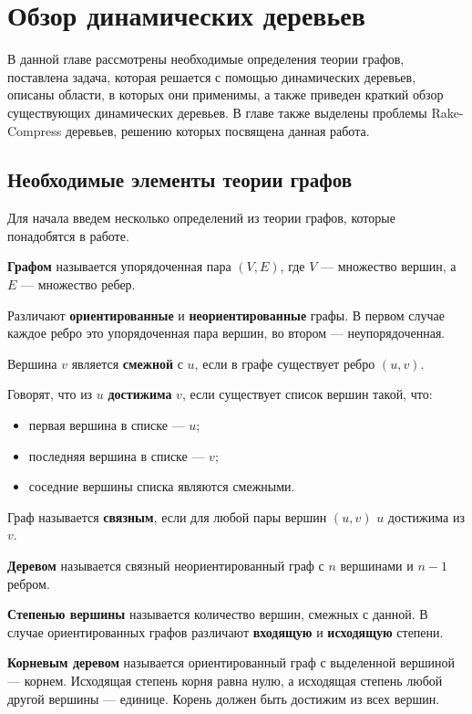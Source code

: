\chapter{Обзор динамических деревьев}
\label{chapSVD}

В данной главе рассмотрены необходимые определения теории графов, 
поставлена задача, которая решается с помощью динамических деревьев, 
описаны области, в которых они применимы, а также 
приведен краткий обзор существующих динамических деревьев. 
В главе также выделены проблемы Rake-Compress деревьев, решению которых посвящена данная работа.

\section{Необходимые элементы теории графов}

Для начала введем несколько определений из теории графов, которые понадобятся в работе.

{\bf Графом} называется упорядоченная пара $(V, E)$, где $V$ --- множество вершин, а $E$ --- множество ребер.

Различают {\bf ориентированные} и {\bf неориентированные} графы. В первом случае каждое ребро это упорядоченная пара вершин, во втором --- неупорядоченная.

Вершина $v$ является {\bf смежной} с $u$, если в графе существует ребро $(u, v)$.

Говорят, что из $u$ {\bf достижима} $v$, если существует список вершин такой, что:
\begin{itemize}
\item первая вершина в списке --- $u$;
\item последняя вершина в списке --- $v$;
\item соседние вершины списка являются смежными.
\end{itemize}  

Граф называется {\bf связным}, если для любой пары вершин $(u, v)$ $u$ достижима из $v$.

{\bf Деревом} называется связный неориентированный граф с $n$ вершинами и $n - 1$ ребром.

{\bf Степенью вершины} называется количество вершин, смежных с данной. В случае ориентированных графов различают {\bf входящую} и {\bf исходящую} степени. 

{\bf Корневым деревом} называется ориентированный граф с выделенной вершиной --- корнем. Исходящая степень корня равна нулю, а исходящая степень любой другой вершины --- единице. Корень должен быть достижим из всех вершин.

